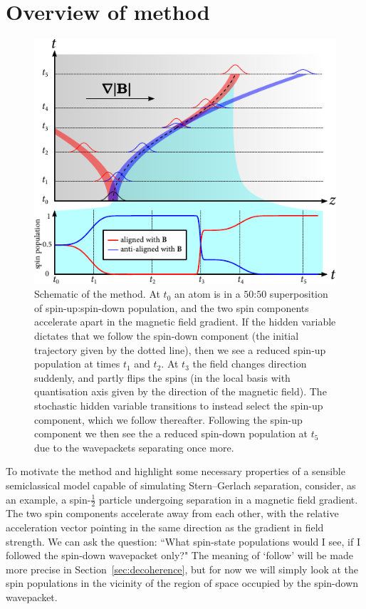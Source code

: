 \section{Overview of method}\label{sec:overview_of_method}

\begin{figure}[t]
    \centerfloat
    \includegraphics{figures/hidden_variables/schematic.pdf}
    \caption{Schematic of the method. At $t_0$ an atom is in a $50$:$50$ superposition of spin-up:spin-down population, and the two spin components accelerate apart in the magnetic field gradient. If the hidden variable dictates that we follow the spin-down component (the initial trajectory given by the dotted line), then we see a reduced spin-up population at times $t_1$ and $t_2$. At $t_3$ the field changes direction suddenly, and partly flips the spins (in the local basis with quantisation axis given by the direction of the magnetic field). The stochastic hidden variable transitions to instead select the spin-up component, which we follow thereafter. Following the spin-up component we then see the a reduced spin-down population at $t_5$ due to the wavepackets separating once more.}\label{fig:HVSC_schematic}
\end{figure}

To motivate the method and highlight some necessary properties of a sensible semiclassical model capable of simulating Stern--Gerlach separation, consider, as an example, a spin-$\frac12$ particle undergoing separation in a magnetic field gradient. The two spin components accelerate away from each other, with the relative acceleration vector pointing in the same direction as the gradient in field strength. We can ask the question: ``What spin-state populations would I see, if I followed the spin-down wavepacket only?" The meaning of `follow' will be made more precise in Section~\ref{sec:decoherence}, but for now we will simply look at the spin populations in the vicinity of the region of space occupied by the spin-down wavepacket.

